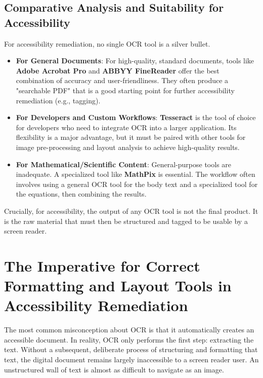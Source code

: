\subsection{Comparative Analysis and Suitability for Accessibility}
\label{subsec:ocr-comparative-analysis}
For accessibility remediation, no single OCR tool is a silver bullet.
\begin{itemize}
	\item \textbf{For General Documents}: For high-quality, standard documents, tools like \textbf{Adobe Acrobat Pro} and \textbf{ABBYY FineReader} offer the best combination of accuracy and user-friendliness. They often produce a "searchable PDF" that is a good starting point for further accessibility remediation (e.g., tagging).
	\item \textbf{For Developers and Custom Workflows}: \textbf{Tesseract} is the tool of choice for developers who need to integrate OCR into a larger application. Its flexibility is a major advantage, but it must be paired with other tools for image pre-processing and layout analysis to achieve high-quality results.
	\item \textbf{For Mathematical/Scientific Content}: General-purpose tools are inadequate. A specialized tool like \textbf{MathPix} is essential. The workflow often involves using a general OCR tool for the body text and a specialized tool for the equations, then combining the results.
\end{itemize}
Crucially, for accessibility, the output of any OCR tool is not the final product. It is the raw material that must then be structured and tagged to be usable by a screen reader.

\section{The Imperative for Correct Formatting and Layout Tools in Accessibility Remediation}
\label{sec:ocr-remediation}
The most common misconception about OCR is that it automatically creates an accessible document. In reality, OCR only performs the first step: extracting the text. Without a subsequent, deliberate process of structuring and formatting that text, the digital document remains largely inaccessible to a screen reader user. An unstructured wall of text is almost as difficult to navigate as an image.

